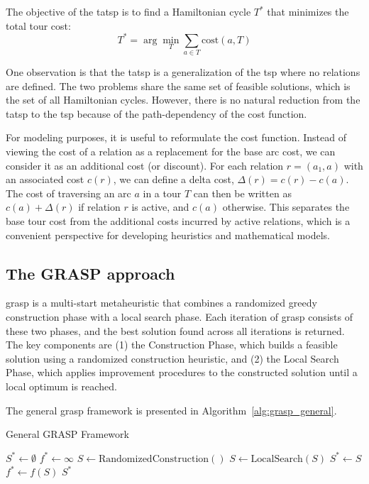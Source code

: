 \documentclass[twocolumn, switch]{article} %
\begin{document}
The objective of the \gls{tatsp} is to find a Hamiltonian cycle $T^*$ that minimizes the total tour cost:
\begin{equation}
T^* = \arg\min_{T} \sum_{a \in T} \text{cost}(a, T)
\end{equation}

One observation is that the \gls{tatsp} is a generalization of the \gls{tsp} where no relations are defined.
The two problems share the same set of feasible solutions, which is the set of all Hamiltonian cycles.
However, there is no natural reduction from the \gls{tatsp} to the \gls{tsp} because of the path-dependency of the cost function.

For modeling purposes, it is useful to reformulate the cost function. Instead of viewing the cost of a relation as a replacement for the base arc cost, we can consider it as an additional cost (or discount). For each relation $r = (a_1, a)$ with an associated cost $c(r)$, we can define a delta cost, $\Delta(r) = c(r) - c(a)$. The cost of traversing an arc $a$ in a tour $T$ can then be written as $c(a) + \Delta(r)$ if relation $r$ is active, and $c(a)$ otherwise. This separates the base tour cost from the additional costs incurred by active relations, which is a convenient perspective for developing heuristics and mathematical models.

\subsection{The GRASP approach}

\gls{grasp} is a multi-start metaheuristic that combines a randomized greedy construction phase with a local search phase. Each iteration of \gls{grasp} consists of these two phases, and the best solution found across all iterations is returned. The key components are (1) the Construction Phase, which builds a feasible solution using a randomized construction heuristic, and (2) the Local Search Phase, which applies improvement procedures to the constructed solution until a local optimum is reached.

The general \gls{grasp} framework is presented in Algorithm~\ref{alg:grasp_general}.

\begin{algorithm}
\caption{General GRASP Framework}
\label{alg:grasp_general}
\begin{algorithmic}[1]
\State $S^* \leftarrow \emptyset$ 
\State $f^* \leftarrow \infty$ 
    \State $S \leftarrow \text{RandomizedConstruction}()$
    \State $S \leftarrow \text{LocalSearch}(S)$
        \State $S^* \leftarrow S$
        \State $f^* \leftarrow f(S)$
    \EndIf
\EndFor
\State \Return $S^*$
\end{algorithmic}
\end{algorithm}
\end{document}

